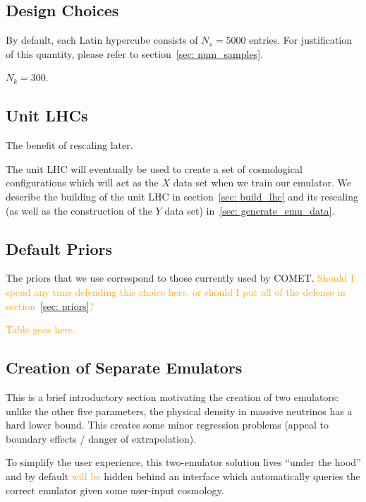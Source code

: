 \subsection{Design Choices}

By default, each Latin hypercube consists of $N_s = 5000$ entries. For 
justification of this quantity, please refer to
section~\ref{sec: num_samples}.

$N_k = 300$.

\subsection{Unit LHCs}
\label{sec: unit_lhc}

The benefit of rescaling later.

The unit LHC will eventually be used to create a set of cosmological
configurations which will act as the $X$ data set when we train our emulator. 
We describe the building of the unit LHC in section~\ref{sec: build_lhc}
and its rescaling (as well as the construction of the $Y$ data set) 
in~\ref{sec: generate_emu_data}.

\subsection{Default Priors}


The priors that we use correspond to those currently used by COMET. \textcolor{orange}{Should I spend any time defending this choice here, or should I put all of the defense in section~\ref{sec: priors}?}

\textcolor{orange}{Table goes here.}

\subsection{Creation of Separate Emulators}

This is a brief introductory section motivating the creation of two emulators:
unlike the other five parameters, the physical density in massive neutrinos 
has a hard lower bound. This creates some minor regression problems (appeal to 
boundary effects / danger of extrapolation).

To simplify the user experience, this two-emulator solution lives ``under the
hood'' and by default \textcolor{orange}{will be} hidden behind an interface
which automatically queries the correct emulator given some user-input
cosmology.

